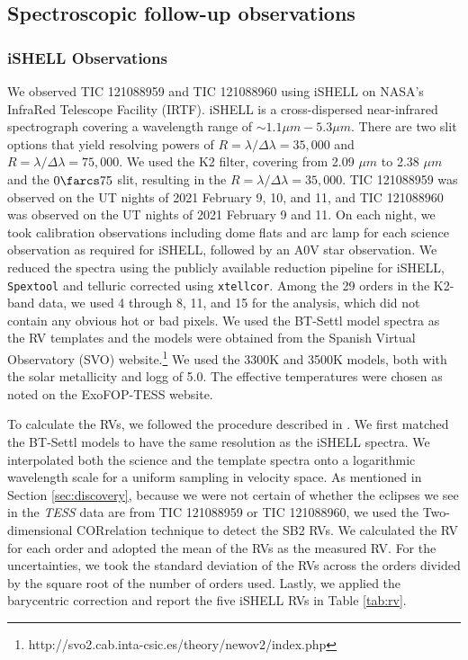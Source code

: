 \documentclass[fleqn,usenatbib]{mnras} %
\begin{document}
\subsection{Spectroscopic follow-up observations}
\subsubsection{iSHELL Observations}
\label{sec:iSHELL}

We observed TIC 121088959 and TIC 121088960 using iSHELL on NASA's InfraRed Telescope Facility (IRTF). iSHELL is a cross-dispersed near-infrared spectrograph covering a wavelength range of $\sim1.1 \mu m - 5.3 \mu m$. There are two slit options that yield resolving powers of $R=\lambda/\Delta\lambda = 35,000$ and $R=\lambda/\Delta\lambda = 75,000$. We used the K2 filter, covering from 2.09 $\mu m$ to 2.38 $\mu m$ and the $0\farcs75$ slit, resulting in the $R=\lambda/\Delta\lambda = 35,000$. TIC 121088959 was observed on the UT nights of 2021 February 9, 10, and 11, and TIC 121088960 was observed on the UT nights of 2021 February 9 and 11. On each night, we took calibration observations including dome flats and arc lamp for each science observation as required for iSHELL, followed by an A0V star observation. We reduced the spectra using the publicly available reduction pipeline for iSHELL, \texttt{Spextool} \citep[][]{spextool} and telluric corrected using \texttt{xtellcor}. Among the 29 orders in the K2-band data, we used 4 through 8, 11, and 15 for the analysis, which did not contain any obvious hot or bad pixels. We used the BT-Settl model spectra \citep[][]{Allard2012} as the RV templates and the models were obtained from the Spanish Virtual Observatory (SVO) website.\footnote{http://svo2.cab.inta-csic.es/theory/newov2/index.php} We used the 3300K and 3500K models, both with the solar metallicity and logg of 5.0. The effective temperatures were chosen as noted on the ExoFOP-TESS website.

To calculate the RVs, we followed the procedure described in \citet[][]{Han2019}. We first matched the BT-Settl models to have the same resolution as the iSHELL spectra. We interpolated both the science and the template spectra onto a logarithmic wavelength scale for a uniform sampling in velocity space. As mentioned in Section \ref{sec:discovery}, because we were not certain of whether the eclipses we see in the {\em TESS} data are from TIC 121088959 or TIC 121088960, we used the Two-dimensional CORrelation technique \citep[TODCOR,][]{TODCOR} to detect the SB2 RVs. We calculated the RV for each order and adopted the mean of the RVs as the measured RV. For the uncertainties, we took the standard deviation of the RVs across the orders divided by the square root of the number of orders used. Lastly, we applied the barycentric correction and report the five iSHELL RVs in Table \ref{tab:rv}.
\end{document}
